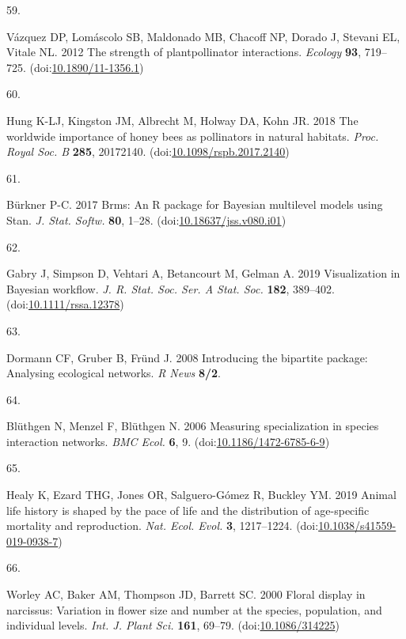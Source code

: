 \documentclass[
  12pt,
  a4paper,
]{article}
\newlength{\cslhangindent}
\newlength{\csllabelwidth}
\newlength{\cslentryspacingunit} %
\newenvironment{CSLReferences}[2] %
 {%
  \setlength{\parindent}{0pt}
  \ifodd #1
  \let\oldpar\par
  \def\par{\hangindent=\cslhangindent\oldpar}
  \fi
  \setlength{\parskip}{#2\cslentryspacingunit}
 }%
 {}
\newcommand{\CSLLeftMargin}[1]{\parbox[t]{\csllabelwidth}{#1}}
\newcommand{\CSLRightInline}[1]{\parbox[t]{\linewidth - \csllabelwidth}{#1}\break}
\begin{document}
\begin{CSLReferences}{0}{0}
\leavevmode{}%
\CSLLeftMargin{59. }
\CSLRightInline{Vázquez DP, Lomáscolo SB, Maldonado MB, Chacoff NP, Dorado J, Stevani EL, Vitale NL. 2012 The strength of plant\textendash pollinator interactions. \emph{Ecology} \textbf{93}, 719--725. (doi:\href{https://doi.org/10.1890/11-1356.1}{10.1890/11-1356.1})}

\leavevmode{}%
\CSLLeftMargin{60. }
\CSLRightInline{Hung K-LJ, Kingston JM, Albrecht M, Holway DA, Kohn JR. 2018 The worldwide importance of honey bees as pollinators in natural habitats. \emph{Proc. Royal Soc. B} \textbf{285}, 20172140. (doi:\href{https://doi.org/10.1098/rspb.2017.2140}{10.1098/rspb.2017.2140})}

\leavevmode{}%
\CSLLeftMargin{61. }
\CSLRightInline{Bürkner P-C. 2017 Brms: {An R} package for {Bayesian} multilevel models using {Stan}. \emph{J. Stat. Softw.} \textbf{80}, 1--28. (doi:\href{https://doi.org/10.18637/jss.v080.i01}{10.18637/jss.v080.i01})}

\leavevmode{}%
\CSLLeftMargin{62. }
\CSLRightInline{Gabry J, Simpson D, Vehtari A, Betancourt M, Gelman A. 2019 Visualization in {Bayesian} workflow. \emph{J. R. Stat. Soc. Ser. A Stat. Soc.} \textbf{182}, 389--402. (doi:\href{https://doi.org/10.1111/rssa.12378}{10.1111/rssa.12378})}

\leavevmode{}%
\CSLLeftMargin{63. }
\CSLRightInline{Dormann CF, Gruber B, Fründ J. 2008 Introducing the bipartite package: Analysing ecological networks. \emph{R News} \textbf{8/2}.}

\leavevmode{}%
\CSLLeftMargin{64. }
\CSLRightInline{Blüthgen N, Menzel F, Blüthgen N. 2006 Measuring specialization in species interaction networks. \emph{BMC Ecol.} \textbf{6}, 9. (doi:\href{https://doi.org/10.1186/1472-6785-6-9}{10.1186/1472-6785-6-9})}

\leavevmode{}%
\CSLLeftMargin{65. }
\CSLRightInline{Healy K, Ezard THG, Jones OR, Salguero-Gómez R, Buckley YM. 2019 Animal life history is shaped by the pace of life and the distribution of age-specific mortality and reproduction. \emph{Nat. Ecol. Evol.} \textbf{3}, 1217--1224. (doi:\href{https://doi.org/10.1038/s41559-019-0938-7}{10.1038/s41559-019-0938-7})}

\leavevmode{}%
\CSLLeftMargin{66. }
\CSLRightInline{Worley AC, Baker AM, Thompson JD, Barrett SC. 2000 Floral display in narcissus: Variation in flower size and number at the species, population, and individual levels. \emph{Int. J. Plant Sci.} \textbf{161}, 69--79. (doi:\href{https://doi.org/10.1086/314225}{10.1086/314225})}


\end{CSLReferences}
\end{document}

